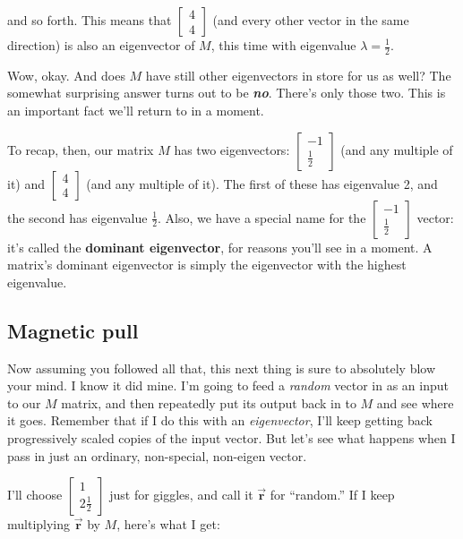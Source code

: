 and so forth. This means that {\footnotesize $\begin{bmatrix} 4 \\ 4
\end{bmatrix}$} (and every other vector in the same direction) is also an
eigenvector of $M$, this time with eigenvalue $\lambda=\frac{1}{2}$.

\bigskip

Wow, okay. And does $M$ have still other eigenvectors in store for us as well?
The somewhat surprising answer turns out to be \textbf{\textit{no}}. There's
only those two. This is an important fact we'll return to in a moment.

\medskip


To recap, then, our matrix $M$ has two eigenvectors: {\scriptsize
$\begin{bmatrix} -1 \\ \frac{1}{2} \end{bmatrix}$} (and any multiple of it) and
{\scriptsize $\begin{bmatrix} 4 \\ 4 \end{bmatrix}$} (and any multiple of it).
The first of these has eigenvalue 2, and the second has eigenvalue
$\frac{1}{2}$. Also, we have a special name for the {\scriptsize
$\begin{bmatrix} -1 \\ \frac{1}{2} \end{bmatrix}$} vector: it's called the
\textbf{dominant eigenvector}, for reasons you'll see in a moment. A matrix's
dominant eigenvector is simply the eigenvector with the highest eigenvalue.

\subsection{Magnetic pull}

Now assuming you followed all that, this next thing is sure to absolutely blow
your mind. I know it did mine. I'm going to feed a \textit{random} vector in as
an input to our $M$ matrix, and then repeatedly put its output back in to $M$
and see where it goes. Remember that if I do this with an \textit{eigenvector},
I'll keep getting back progressively scaled copies of the input vector. But
let's see what happens when I pass in just an ordinary, non-special, non-eigen
vector.

I'll choose {\footnotesize $\begin{bmatrix} 1 \\ 2\frac{1}{2} \end{bmatrix}$}
just for giggles, and call it $\overrightarrow{\textbf{r}}$ for ``random.'' If
I keep multiplying $\overrightarrow{\textbf{r}}$ by $M$, here's what I get:


